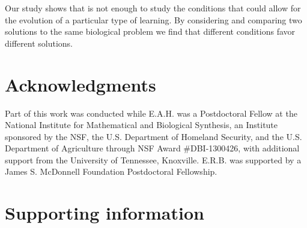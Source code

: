Our study shows that is not enough to study the conditions that could allow for the evolution of a particular type of learning. By considering and comparing two solutions to the same biological problem we find that different conditions favor different solutions. %

\section*{Acknowledgments}
Part of this work was conducted while E.A.H. was a Postdoctoral Fellow at the National Institute for Mathematical and Biological Synthesis, an Institute sponsored by the NSF, the U.S. Department of Homeland Security, and the U.S. Department of Agriculture through NSF Award \#DBI-1300426, with additional support from the University of Tennessee, Knoxville. E.R.B. was supported by a James S. McDonnell Foundation Postdoctoral Fellowship.

\newpage



\clearpage{}
\renewcommand{\thesection}{}
\section{Supporting information}
\renewcommand{\thesection}{S}
\renewcommand{\thesubsection}{S\arabic{subsection}}
\renewcommand{\theequation}{S\arabic{equation}}
\renewcommand{\thetable}{S\arabic{table}}
\renewcommand{\thefigure}{S\arabic{figure}}
\setcounter{equation}{0}  
\setcounter{figure}{0}
\setcounter{table}{0}


